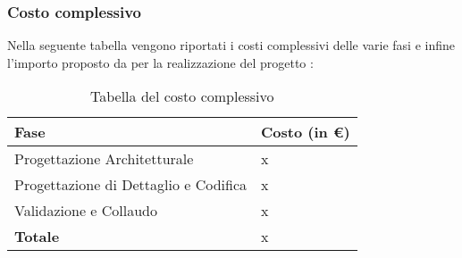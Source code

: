 \subsubsection{Costo complessivo}
Nella seguente tabella vengono riportati i costi complessivi delle varie fasi e infine l'importo proposto da \Gruppo{} per la realizzazione del progetto \NomeProgetto{}:\\
{
\renewcommand{\arraystretch}{2}
\begin{longtable}{ C{5cm} C{5cm}}
\caption{Tabella del costo complessivo}\\
\rowcolor{\primaryColor}

\textcolor{\secondaryColor}{\textbf{Fase}} &
\textcolor{\secondaryColor}{\textbf{Costo  (in \euro{})}}\\	
\endhead
		
Progettazione Architetturale          &  x \\
Progettazione di Dettaglio e Codifica &  x \\
Validazione e Collaudo                &  x \\
\textbf{Totale}                       &  x \\

\end{longtable}
}